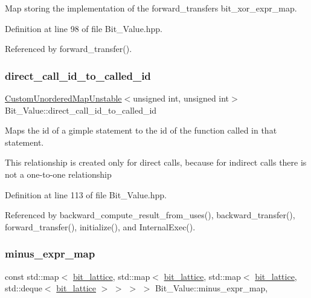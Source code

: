 Map storing the implementation of the forward\+\_\+transfer\textquotesingle{}s bit\+\_\+xor\+\_\+expr\+\_\+map. 



Definition at line 98 of file Bit\+\_\+\+Value.\+hpp.



Referenced by forward\+\_\+transfer().

\mbox{\label{classBit__Value_a97724dd3554d471ea1ad42f5b5b4f1cf}} 
\subsubsection{\texorpdfstring{direct\+\_\+call\+\_\+id\+\_\+to\+\_\+called\+\_\+id}{direct\_call\_id\_to\_called\_id}}
{\footnotesize\ttfamily \hyperlink{custom__map_8hpp_a8cbaceffc09790a885ec7e9c17809c69}{Custom\+Unordered\+Map\+Unstable}$<$unsigned int, unsigned int$>$ Bit\+\_\+\+Value\+::direct\+\_\+call\+\_\+id\+\_\+to\+\_\+called\+\_\+id\hspace{0.3cm}{\ttfamily [private]}}



Maps the id of a gimple statement to the id of the function called in that statement. 

This relationship is created only for direct calls, because for indirect calls there is not a one-\/to-\/one relationship 

Definition at line 113 of file Bit\+\_\+\+Value.\+hpp.



Referenced by backward\+\_\+compute\+\_\+result\+\_\+from\+\_\+uses(), backward\+\_\+transfer(), forward\+\_\+transfer(), initialize(), and Internal\+Exec().

\mbox{\label{classBit__Value_a14e017ca4c0bf5fd112f293bd7d1af3b}} 
\subsubsection{\texorpdfstring{minus\+\_\+expr\+\_\+map}{minus\_expr\_map}}
{\footnotesize\ttfamily const std\+::map$<$ \hyperlink{bit__lattice_8hpp_ab732360111c810c4eaeb4c8b81d160d6}{bit\+\_\+lattice}, std\+::map$<$ \hyperlink{bit__lattice_8hpp_ab732360111c810c4eaeb4c8b81d160d6}{bit\+\_\+lattice}, std\+::map$<$ \hyperlink{bit__lattice_8hpp_ab732360111c810c4eaeb4c8b81d160d6}{bit\+\_\+lattice}, std\+::deque$<$ \hyperlink{bit__lattice_8hpp_ab732360111c810c4eaeb4c8b81d160d6}{bit\+\_\+lattice} $>$ $>$ $>$ $>$ Bit\+\_\+\+Value\+::minus\+\_\+expr\+\_\+map\hspace{0.3cm}{\ttfamily [static]}, {\ttfamily [private]}}



